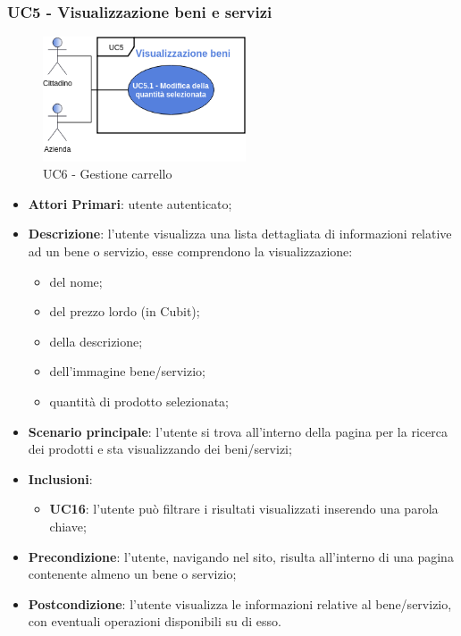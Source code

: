  \subsubsection{UC5 - Visualizzazione beni e servizi}
  \begin{figure}[h]
 	\includegraphics[width=6cm]{res/images/UC5-Generale.png}
 	\centering
 	\caption{UC6 - Gestione carrello}
 \end{figure}
 \begin{itemize}
 	\item \textbf{Attori Primari}: utente autenticato;
 	\item \textbf{Descrizione}: l'utente visualizza una lista dettagliata di informazioni relative ad un bene o servizio, esse comprendono la visualizzazione:
 	\begin{itemize}
 		\item del nome;
 		\item del prezzo lordo (in Cubit\glo);
 		\item della descrizione;
 		\item dell'immagine bene/servizio;
 		\item quantità di prodotto selezionata;
 	\end{itemize}
 	\item \textbf{Scenario principale}: l'utente si trova all'interno della pagina per la ricerca dei prodotti e sta visualizzando dei beni/servizi;
	\item \textbf{Inclusioni}:
	\begin{itemize}
		\item \textbf{UC16}: l'utente può filtrare i risultati visualizzati inserendo una parola chiave;
	\end{itemize}
 	\item \textbf{Precondizione}: l'utente, navigando nel sito, risulta all'interno di una pagina contenente almeno un bene o servizio;
 	\item \textbf{Postcondizione}: l'utente visualizza le informazioni relative al bene/servizio, con eventuali operazioni disponibili su di esso.
 \end{itemize}
